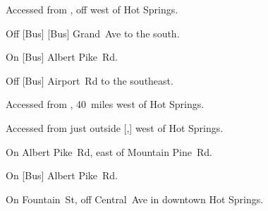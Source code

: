 
\begin{LocationList}

Accessed from , off  west of Hot Springs.

Off [Bus] [Bus] Grand~Ave to the south.

On [Bus] Albert Pike~Rd.

Off [Bus] Airport~Rd to the southeast.

Accessed from , 40~miles west of Hot Springs.

Accessed from  just outside [,] west of Hot Springs.

On  Albert Pike~Rd, east of  Mountain Pine~Rd.

On [Bus] Albert Pike~Rd.

On Fountain~St, off  Central~Ave in downtown Hot Springs.

\end{LocationList}

